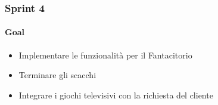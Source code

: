 \documentclass{beamer}
\begin{document}
\begin{frame}
  \frametitle{Sprint 4}
  \framesubtitle{Goal}

  \begin{itemize}
    \item Implementare le funzionalità per il Fantacitorio
    \item Terminare gli scacchi
    \item Integrare i giochi televisivi con la richiesta del cliente
  \end{itemize}

\end{frame}


\end{document}

